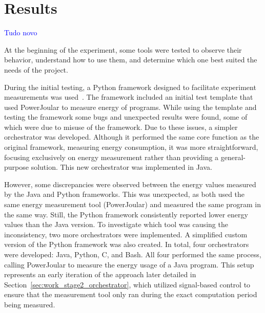 \chapter{Results}\label{chapter:results}\textcolor{blue}{Tudo novo}


At the beginning of the experiment, some tools were tested to observe their behavior, understand how to use them, and determine which one best suited the needs of the project.

During the initial testing, a Python framework designed to facilitate experiment measurements was used~\cite{S2_Group_Experiment_Runner}. The framework included an initial test template that used PowerJoular to measure energy of programs. While using the template and testing the framework some bugs and unexpected results were found, some of which were due to misuse of the framework.
Due to these issues, a simpler orchestrator was developed. Although it performed the same core function as the original framework, measuring energy consumption, it was more straightforward, focusing exclusively on energy measurement rather than providing a general-purpose solution. This new orchestrator was implemented in Java.

However, some discrepancies were observed between the energy values measured by the Java and Python frameworks. This was unexpected, as both used the same energy measurement tool (PowerJoular) and measured the same program in the same way. Still, the Python framework consistently reported lower energy values than the Java version.
To investigate which tool was causing the inconsistency, two more orchestrators were implemented. A simplified custom version of the Python framework was also created. In total, four orchestrators were developed: Java, Python, C, and Bash. All four performed the same process, calling PowerJoular to measure the energy usage of a Java program.
This setup represents an early iteration of the approach later detailed in Section~\ref{sec:work_stage2_orchestrator}, which utilized signal-based control to ensure that the measurement tool only ran during the exact computation period being measured.


